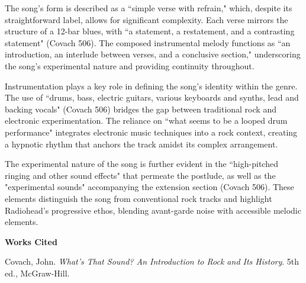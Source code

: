 \documentclass[12pt]{article}
\begin{document}
The song’s form is described as a ``simple verse with refrain," which, despite its straightforward label, allows for significant complexity. Each verse mirrors the structure of a 12-bar blues, with ``a statement, a restatement, and a contrasting statement" (Covach 506). The composed instrumental melody functions as ``an introduction, an interlude between verses, and a conclusive section," underscoring the song’s experimental nature and providing continuity throughout.

Instrumentation plays a key role in defining the song's identity within the genre. The use of ``drums, bass, electric guitars, various keyboards and synths, lead and backing vocals" (Covach 506) bridges the gap between traditional rock and electronic experimentation. The reliance on ``what seems to be a looped drum performance" integrates electronic music techniques into a rock context, creating a hypnotic rhythm that anchors the track amidst its complex arrangement.

The experimental nature of the song is further evident in the ``high-pitched ringing and other sound effects" that permeate the postlude, as well as the "experimental sounds" accompanying the extension section (Covach 506). These elements distinguish the song from conventional rock tracks and highlight Radiohead's progressive ethos, blending avant-garde noise with accessible melodic elements.

\begin{center}
\textbf{Works Cited}
\end{center}

Covach, John. \textit{What’s That Sound? An Introduction to Rock and Its History}. 5th ed., McGraw-Hill.
\end{document}
